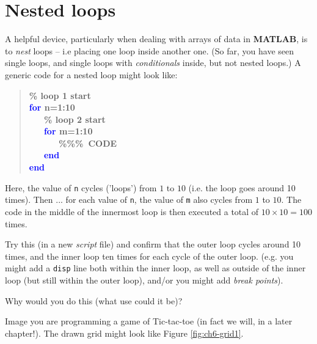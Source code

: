 \documentclass{tufte-book} %
\newenvironment{docspecbold}{\begin{quotation}\ttfamily\bfseries\parskip0pt\parindent0pt\ignorespaces}{\end{quotation}}
\begin{document}
\newpage


\section{Nested loops}

A helpful device, particularly when dealing with arrays of data in \textbf{MATLAB}, is to \textit{nest} loops -- i.e placing one loop inside another one. (So far, you have seen single loops, and single loops with \textit{conditionals} inside, but not nested loops.) A generic code for a nested loop might look like:
\begin{docspecbold}
\textcolor[rgb]{0,0.501961,0}{\% loop 1 start\\}
\textcolor{blue}{for} n=1:10\\
\ \ \ \textcolor[rgb]{0,0.501961,0}{\% loop 2 start\\}
\ \ \ \textcolor{blue}{for} m=1:10\\
\ \ \ \ \ \ \textcolor[rgb]{0,0.501961,0}{\%\%\%\ CODE\\}
\ \ \ \textcolor{blue}{end}\\
\textcolor{blue}{end}
\end{docspecbold}
Here, the value of \texttt{n} cycles ('loops') from \(1\) to \(10\) (i.e. the loop goes around 10 times). Then ... for each value of \texttt{n}, the value of \texttt{m} also cycles from \(1\) to \(10\). The code in the middle of the innermost loop is then executed a total of \(10\times 10=100\) times.

Try this (in a new \textit{script} file) and confirm that the outer loop cycles around 10 times, and the inner loop ten times for each cycle of the outer loop. (e.g. you might add a \texttt{disp} line both within the inner loop, as well as outside of the inner loop (but still within the outer loop), and/or you might add \textit{break points}).

Why would you do this (what use could it be)?

Image you are programming a game of Tic-tac-toe (in fact we will, in a later chapter!). The drawn grid might look like Figure \ref{fig:ch6-grid1}.
\end{document}

